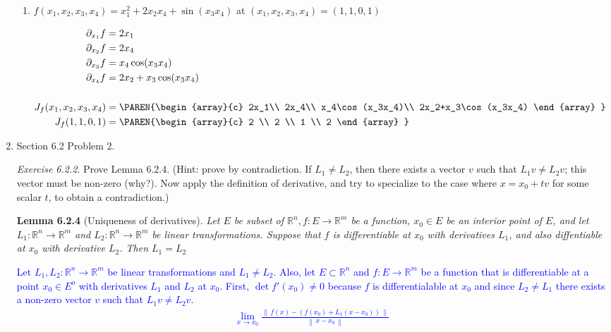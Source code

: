 \documentclass[10pt,a4paper]{report}
\newcommand{\BLUE}[1]{\textcolor{blue}{#1}}
\begin{document}
\begin{enumerate}[label=\Roman*.]
\begin{enumerate}[label=(\alph*)]
	\item $f(x_1,x_2,x_3,x_4) = x_1^2+2x_2x_4+\sin(x_3x_4)$ at $(x_1,x_2,x_3,x_4) = (1,1,0,1)$
	
	\BLUE{\begin{align*}
		\partial_{x_1}f &= 2x_1\\
		\partial_{x_2}f &= 2x_4\\
		\partial_{x_3}f &= x_4\cos(x_3x_4)\\
		\partial_{x_4}f &= 2x_2+x_3\cos(x_3x_4) \\
		\\
		J_f(x_1,x_2,x_3,x_4) &= \PAREN{\begin{array}{c}
			2x_1\\
			2x_4\\
			x_4\cos(x_3x_4)\\
			2x_2+x_3\cos(x_3x_4)		
		\end{array} }\\
		J_f(1,1,0,1) &= \PAREN{\begin{array}{c}
			2 \\
			2 \\
			1 \\
			2
		\end{array}
		} 
	\end{align*}
	}
\end{enumerate}

\item Section 6.2 Problem 2.

	\textit{Exercise 6.2.2}.  Prove Lemma 6.2.4. (Hint: prove by contradiction.  If $L_1 \ne L_2$, then there exists a vector $v$ such that $L_1v \ne L_2v$; this vector must be non-zero (why?).  Now apply the definition of derivative, and try to specialize to the case where $x=x_0+tv$ for some scalar $t$, to obtain a contradiction.)

\newcommand{\RRR}{\mathbb{R}}	
	\textbf{Lemma 6.2.4} (Uniqueness of derivatives).  \textit{Let $E$ be  subset of $\RRR^n, f: E\to \RRR^m$ be a function, $x_0\in E$ be an interior point of $E$, and let $L_1: \RRR^n\to \RRR^m$ and $L_2: \RRR^n\to \RRR^m$ be linear transformations.  Suppose that $f$ is differentiable at $x_0$ with derivatives $L_1$, and also diffentiable at $x_0$ with derivative $L_2$.  Then $L_1=L_2$}
\newcommand{\NORM}[1]{\left \lVert\, #1\, \right \lVert}	

	\BLUE{Let $L_1, L_2: \RRR^n \to \RRR^m$ be linear transformations and $L_1 \ne L_2$.  Also, let $E \subset \RRR^n$ and $f: E \to \RRR^m$ be a function that is differentiable at a point $x_0 \in E^o$ with derivatives $L_1$ and $L_2$ at $x_0$.  First, $\det f'(x_0) \ne 0$ because $f$ is differentialable at $x_0$ and since $L_2 \ne L_1$ there exists a non-zero vector $v$ such that $L_1 v \ne L_2 v$.
	\begin{align*}
		\lim_{x \to x_0} \frac{\NORM{f(x)-(f(x_0)+L_1(x-x_0))}}{\NORM{x-x_0}}
	\end{align*}
	}
	

\end{enumerate}
\end{document}
